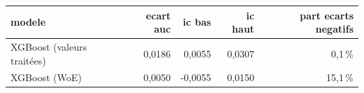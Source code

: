 \begin{tabular}{lrrrr}
\toprule
\textbf{modele} & \textbf{ecart auc} & \textbf{ic bas} & \textbf{ic haut} & \textbf{part ecarts negatifs} \\
\midrule
XGBoost (valeurs traitées) & 0,0186 & 0,0055 & 0,0307 & 0,1\,\% \\
XGBoost (WoE) & 0,0050 & -0,0055 & 0,0150 & 15,1\,\% \\
\bottomrule
\end{tabular}
